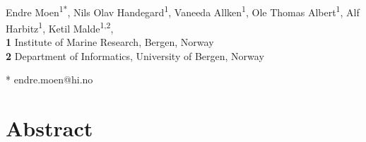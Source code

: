 \documentclass[10pt,letterpaper]{article}
\begin{document}
\vspace*{0.2in}

\begin{flushleft}
{\Large
\textbf{} %
}
\newline
\\
Endre Moen\textsuperscript{1*},
Nils Olav Handegard\textsuperscript{1},
Vaneeda Allken\textsuperscript{1},
Ole Thomas Albert\textsuperscript{1},
Alf Harbitz\textsuperscript{1},
Ketil Malde\textsuperscript{1,2},
\\
\bigskip
\textbf{1} Institute of Marine Research, Bergen, Norway
\\
\textbf{2} Department of Informatics, University of Bergen, Norway
\\
\bigskip

* endre.moen@hi.no

\end{flushleft}

\linenumbers

\section*{Abstract}


\end{document}
